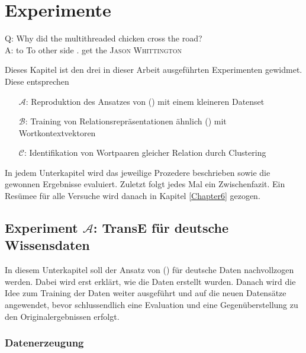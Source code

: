 
\chapter{Experimente} %

\label{Chapter5} %


\begin{itquote}
Q: Why did the multithreaded chicken cross the road?\\
A: to To other side . get the
\flushright
\textsc{Jason Whittington}
\end{itquote}

Dieses Kapitel ist den drei in dieser Arbeit ausgeführten Experimenten gewidmet. Diese entsprechen
\begin{itemize}
  \item[$\mathcal{A}$:] Reproduktion des Ansatzes von (\cite{bordes2013translating}) mit einem kleineren Datenset
  \item[$\mathcal{B}$:] Training von Relationsrepräsentationen ähnlich (\cite{bordes2013translating}) mit Wortkontextvektoren
  \item[$\mathcal{C}$:] Identifikation von Wortpaaren gleicher Relation durch Clustering
\end{itemize}
In jedem Unterkapitel wird das jeweilige Prozedere beschrieben sowie die gewonnen Ergebnisse evaluiert. Zuletzt folgt
jedes Mal ein Zwischenfazit. Ein Resümee für alle Versuche wird danach in Kapitel \ref{Chapter6} gezogen.

\section{Experiment $\mathcal{A}$: TransE für deutsche Wissensdaten}\label{sec:exp-a}

In diesem Unterkapitel soll der Ansatz von (\cite{bordes2013translating}) für deutsche Daten nachvollzogen werden.
Dabei wird erst erklärt, wie die Daten erstellt wurden. Danach wird die Idee zum Training der Daten weiter ausgeführt und
auf die neuen Datensätze angewendet, bevor schlussendlich eine Evaluation und eine Gegenüberstellung zu den Originalergebnissen
erfolgt.

\subsection{Datenerzeugung}


